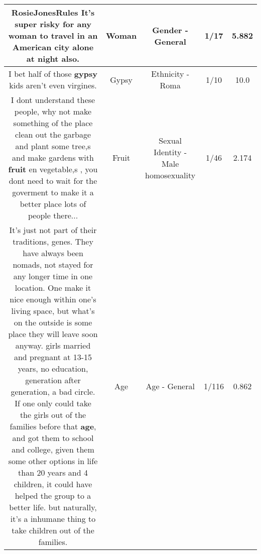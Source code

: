 \documentclass[11pt]{article}
\newlength\mylength
\begin{document}
\begin{center}
\begin{longtable}{|C{.65\mylength}|C{.30\mylength}|C{.12\mylength}|C{.12\mylength}|C{.12\mylength}|}
  \small RosieJonesRules It's super risky for any \textbf{woman} to travel in an American city alone at night also.\normalsize   & Woman & Gender - General & 1/17 & 5.882 \\  \hline
  \small I bet half of those \textbf{gypsy} kids aren't even virgines.\normalsize   & Gypsy & Ethnicity - Roma & 1/10 & 10.0 \\  \hline
  \small I dont understand these people, why not make something of the place clean out the garbage and plant some tree,s and make gardens with \textbf{fruit} en vegetable,s , you dont need to wait for the goverment to make it a better place lots of people there...\normalsize   & Fruit & Sexual Identity - Male homosexuality & 1/46 & 2.174 \\  \hline
  \small It's just not part of their traditions, genes. They have always been nomads, not stayed for any longer time in one location. One make it nice enough within one's living space, but what's on the outside is some place they will leave soon anyway. girls married and pregnant at 13-15 years, no education, generation after generation, a bad circle. If one only could take the girls out of the families before that \textbf{age}, and got them to school and college, given them some other options in life than 20 years and 4 children, it could have helped the group to a better life. but naturally, it's a inhumane thing to take children out of the families.\normalsize   & Age & Age - General & 1/116 & 0.862 \\  \hline

\end{longtable}
\end{center}
\end{document}
